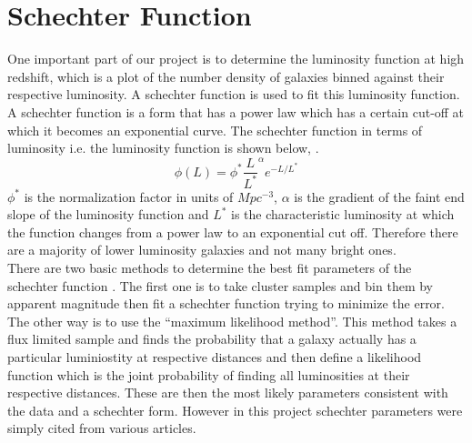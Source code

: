 \documentclass{article}
\begin{document}
\section{Schechter Function}
One important part of our project is to determine the luminosity function at high redshift, which is a plot of the number density of galaxies binned against their respective luminosity. A schechter function is used to fit this luminosity function. A schechter function is a form that has a power law which has a certain cut-off at which it becomes an exponential curve. The schechter function in terms of luminosity i.e. the luminosity function is shown below, \cite{cosmo_number_densities}.
\begin{equation}
\phi(L)=\phi^{*}\frac{L}{L^{*}}^{\alpha}e^{-L/L^{*}}
\end{equation}
\indent $\phi^{*}$ is the normalization factor in units of $Mpc^{-3}$, $\alpha$ is the gradient of the faint end slope of the luminosity function and $L^{*}$ is the characteristic luminosity at which the function changes from a power law to an exponential cut off. Therefore there are a majority of lower luminosity galaxies and not many bright ones.\\

\indent There are two basic methods to determine the best fit parameters of the schechter function \cite{luminosity_functions_online}. The first one is to take cluster samples and bin them by apparent magnitude then fit a schechter function trying to minimize the error. The other way is to use the ``maximum likelihood method''. This method takes a flux limited sample and finds the probability that a galaxy actually has a particular luminiostity at respective distances and then define a likelihood function which is the joint probability of finding all luminosities at their respective distances. These are then the most likely parameters consistent with the data and a schechter form. However in this project schechter parameters were simply cited from various articles.\\
\end{document}
